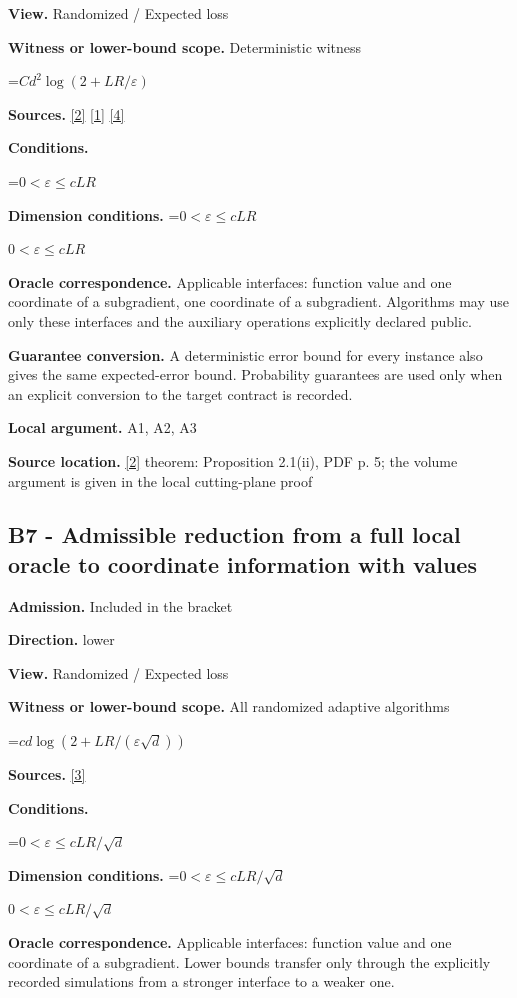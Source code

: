\documentclass[10pt,a4paper]{article}
\newcommand{\AtlasMath}[1]{\par\begingroup\centering\setbox0=\hbox{$\displaystyle #1$}\ifdim\wd0>1.4\linewidth\typeout{ATLAS WIDE FORMULA: \the\wd0}\fi\ifdim\wd0>\linewidth\resizebox{\linewidth}{!}{\box0}\else\box0\fi\par\endgroup}
\newcommand{\AtlasInlineMath}[1]{\begingroup\setbox0=\hbox{$#1$}\ifdim\wd0>.4\linewidth\endgroup\AtlasMath{#1}\else\endgroup$#1$\fi}
\begin{document}
\textbf{View.} Randomized / Expected loss

\textbf{Witness or lower-bound scope.} Deterministic witness

\AtlasMath{Cd^2\log(2+LR/\varepsilon)}
\textbf{Sources.} \href{https://www2.isye.gatech.edu/~nemirovs/MOR_AccuracyCertificates.pdf}{[2]} \href{https://arxiv.org/pdf/1405.4980}{[1]} \href{https://arxiv.org/pdf/2609.20701}{[4]}

\textbf{Conditions.} 
\AtlasMath{0<\varepsilon\le cLR}


\textbf{Dimension conditions.} \AtlasInlineMath{0<\varepsilon\le cLR}

\textbf{Oracle correspondence.} Applicable interfaces: function value and one coordinate of a subgradient, one coordinate of a subgradient. Algorithms may use only these interfaces and the auxiliary operations explicitly declared public.

\textbf{Guarantee conversion.} A deterministic error bound for every instance also gives the same expected-error bound. Probability guarantees are used only when an explicit conversion to the target contract is recorded.

\textbf{Local argument.} A1, A2, A3

\textbf{Source location.} \href{https://www2.isye.gatech.edu/~nemirovs/MOR_AccuracyCertificates.pdf}{[2]} theorem: Proposition 2.1(ii), PDF p. 5; the volume argument is given in the local cutting-plane proof

\subsection{B7 - Admissible reduction from a full local oracle to coordinate information with values}
\textbf{Admission.} Included in the bracket

\textbf{Direction.} lower

\textbf{View.} Randomized / Expected loss

\textbf{Witness or lower-bound scope.} All randomized adaptive algorithms

\AtlasMath{cd\log(2+LR/(\varepsilon\sqrt d))}
\textbf{Sources.} \href{https://arxiv.org/pdf/1407.5144}{[3]}

\textbf{Conditions.} 
\AtlasMath{0<\varepsilon\le cLR/\sqrt d}


\textbf{Dimension conditions.} \AtlasInlineMath{0<\varepsilon\le cLR/\sqrt d}

\textbf{Oracle correspondence.} Applicable interfaces: function value and one coordinate of a subgradient. Lower bounds transfer only through the explicitly recorded simulations from a stronger interface to a weaker one.
\end{document}

